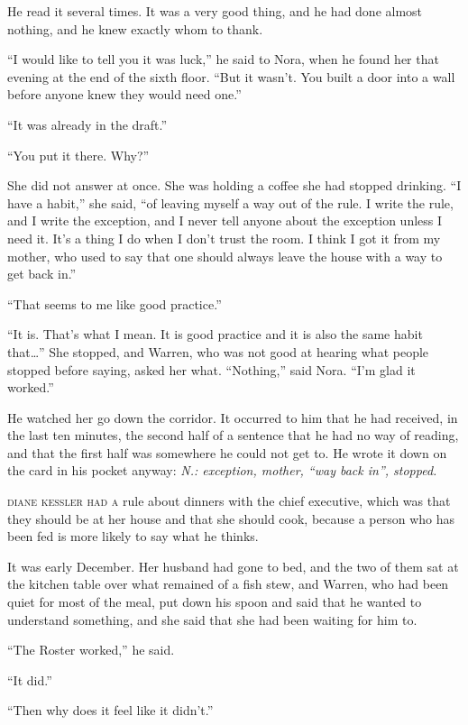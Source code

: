 He read it several times. It was a very good thing, and he had done almost nothing, and he knew exactly whom to thank.

``I would like to tell you it was luck,'' he said to Nora, when he found her that evening at the end of the sixth floor. ``But it wasn't. You built a door into a wall before anyone knew they would need one.''

``It was already in the draft.''

``You put it there. Why?''

She did not answer at once. She was holding a coffee she had stopped drinking. ``I have a habit,'' she said, ``of leaving myself a way out of the rule. I write the rule, and I write the exception, and I never tell anyone about the exception unless I need it. It's a thing I do when I don't trust the room. I think I got it from my mother, who used to say that one should always leave the house with a way to get back in.''

``That seems to me like good practice.''

``It is. That's what I mean. It is good practice and it is also the same habit that\ldots{}'' She stopped, and Warren, who was not good at hearing what people stopped before saying, asked her what. ``Nothing,'' said Nora. ``I'm glad it worked.''

He watched her go down the corridor. It occurred to him that he had received, in the last ten minutes, the second half of a sentence that he had no way of reading, and that the first half was somewhere he could not get to. He wrote it down on the card in his pocket anyway: \emph{N.: exception, mother, ``way back in'', stopped.}


\textsc{diane kessler had a} rule about dinners with the chief executive, which was that they should be at her house and that she should cook, because a person who has been fed is more likely to say what he thinks.

It was early December. Her husband had gone to bed, and the two of them sat at the kitchen table over what remained of a fish stew, and Warren, who had been quiet for most of the meal, put down his spoon and said that he wanted to understand something, and she said that she had been waiting for him to.

``The Roster worked,'' he said.

``It did.''

``Then why does it feel like it didn't.''

